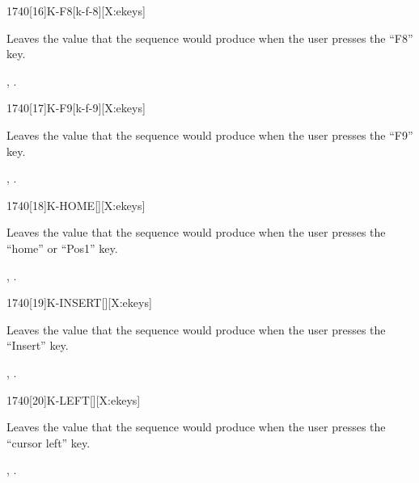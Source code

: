 \begin{worddef}{1740}[16]{K-F8}[k-f-8][X:ekeys]
\item {}

	Leaves the value  that the sequence 
	 would produce when the user presses the
	``F8'' key.

\see {},
	.
\end{worddef}


\begin{worddef}{1740}[17]{K-F9}[k-f-9][X:ekeys]
\item {}

	Leaves the value  that the sequence 
	 would produce when the user presses the
	``F9'' key.

\see {},
	.
\end{worddef}


\begin{worddef}{1740}[18]{K-HOME}[][X:ekeys]
\item {}

	Leaves the value  that the sequence 
	 would produce when the user presses the
	``home'' or ``Pos1'' key.

\see {},
	.
\end{worddef}


\begin{worddef}{1740}[19]{K-INSERT}[][X:ekeys]
\item {}

	Leaves the value  that the sequence 
	 would produce when the user presses the
	``Insert'' key.

\see {},
	.
\end{worddef}


\begin{worddef}{1740}[20]{K-LEFT}[][X:ekeys]
\item {}

	Leaves the value  that the sequence 
	 would produce when the user presses the
	``cursor left'' key.

\see {},
	.
\end{worddef}


